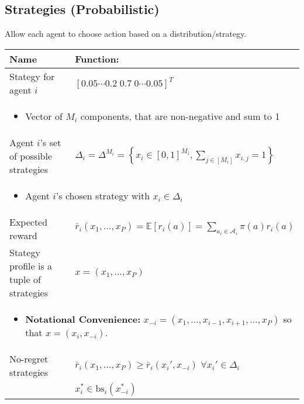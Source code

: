\subsection{Strategies (Probabilistic)}
\begin{summary} Allow each agent to choose action based on a distribution/strategy. 
    \begin{center}
        \begin{tabular}{ll}
            \toprule
            \textbf{Name} & \textbf{Function:} \\
            \midrule
            Stategy for agent $i$ & $[0.05 \cdots 0.2 \; 0.7 \; 0 \cdots 0.05]^T$ \\
            \multicolumn{2}{p{\linewidth}}{
                \begin{itemize}
                    \item Vector of $M_i$ components, that are non-negative and sum to 1
                \end{itemize}} \\
            \midrule
            Agent $i$'s set of possible strategies & $\Delta_i = \Delta^{M_i} = \left\{x_i \in [0,1]^{M_i}, \sum_{j \in [M_i]} x_{i,j} = 1 \right\}$ \\
            \multicolumn{2}{p{\linewidth}}{
                \begin{itemize}
                    \item Agent $i$'s chosen strategy with $x_i \in \Delta_i$
                \end{itemize}} \\
            \midrule
            Expected reward & $\bar{r}_i(x_1,\ldots,x_P) = \mathbb{E}[r_i(a)] = \sum_{a_i \in \mathcal{A}_i} \pi(a) r_i(a)$ \\
            \midrule
            Stategy profile is a tuple of strategies & $x=(x_1,\ldots,x_P)$ \\
            \multicolumn{2}{p{\linewidth}}{
                \begin{itemize}
                    \item \textbf{Notational Convenience:} $x_{-i} = (x_1,\ldots,x_{i-1},x_{i+1},\ldots,x_P)$ so that $x=(x_i,x_{-i})$. 
                \end{itemize}} \\
            \midrule
            No-regret strategies & $\bar{r}_i(x_1,\ldots,x_P) \geq \bar{r}_i(x_i',x_{-i}) \; \forall x_i' \in \Delta_i$ \\
            & $x_i^* \in \text{bs}_i (x_{-i}^*)$ \\

\end{tabular}
\end{center}
\end{summary}
